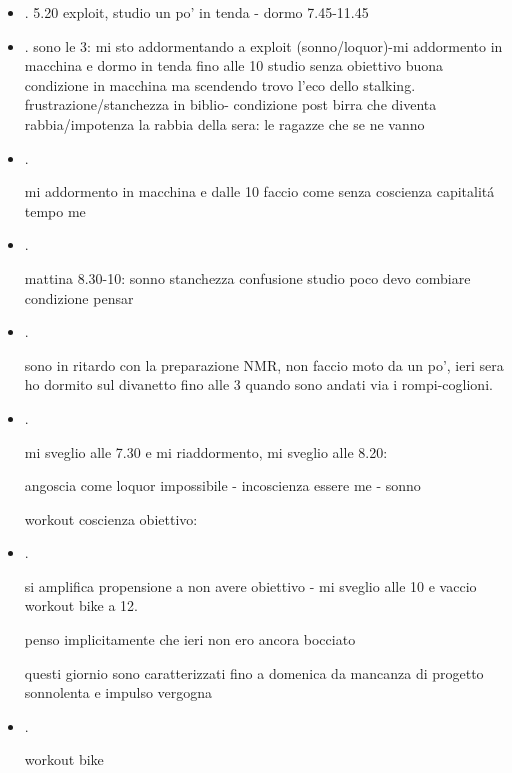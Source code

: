 \begin{itemize}
\item {}.
  5.20 exploit, studio un po' in tenda - dormo 7.45-11.45
  
 \item {}.
sono le 3: mi sto addormentando a exploit (sonno/loquor)-mi addormento in macchina e dormo in tenda fino alle 10
studio senza obiettivo
buona condizione in macchina ma scendendo trovo l'eco dello stalking.
frustrazione/stanchezza in biblio- condizione post birra che diventa rabbia/impotenza
la rabbia della sera: le ragazze che se ne vanno

\item {}.

mi addormento in macchina e dalle 10 faccio come senza coscienza capitalit\'a tempo me

\item {}.

mattina 8.30-10: sonno stanchezza confusione studio poco devo combiare condizione pensar

\item {}.

sono in ritardo con la preparazione NMR, non faccio moto da un po', ieri sera ho dormito sul divanetto fino alle 3 quando sono andati via i rompi-coglioni.

\item {}.

mi sveglio alle 7.30 e mi riaddormento, mi sveglio alle 8.20: 

angoscia come loquor impossibile - incoscienza essere me - sonno

workout coscienza obiettivo: 

\item {}.

si amplifica propensione a non avere obiettivo - mi sveglio alle 10 e vaccio workout bike a 12.

penso implicitamente che ieri non ero ancora bocciato

questi giornio sono caratterizzati fino a domenica da mancanza di progetto sonnolenta e impulso vergogna


\item {}.

workout bike


\end{itemize}
